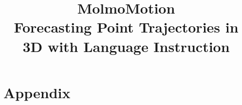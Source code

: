 \documentclass[table]{ai2style/ai2}
\title{MolmoMotion\\[4pt]
  {\Large Forecasting Point Trajectories in 3D with Language Instruction}}
\affiliation[\allenAiAff]{Allen Institute for AI}
\affiliation[\uwAff]{University of Washington}
\affiliation[\uncAff]{UNC-Chapel Hill}
\begin{document}
\maketitle







\clearpage



\clearpage
\appendix
\section*{Appendix}

\end{document}
